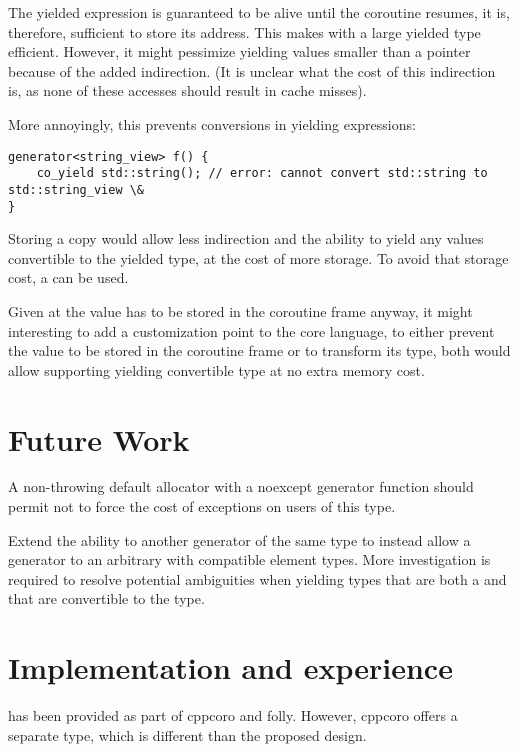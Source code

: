 \documentclass{wg21}
\begin{document}
The yielded expression is guaranteed to be alive until the coroutine resumes, it is, therefore, sufficient to store
its address. 
This makes  with a large yielded type efficient.
However, it might pessimize yielding values smaller than a pointer because of the added indirection.
(It is unclear what the cost of this indirection is, as none of these accesses should result in cache misses).

More annoyingly, this prevents conversions in yielding expressions:

\begin{lstlisting}[style=color]
generator<string_view> f() {
    co_yield std::string(); // error: cannot convert std::string to std::string_view \&
}
\end{lstlisting}

Storing a copy would allow less indirection and the ability to yield any values convertible to the yielded type,
at the cost of more storage.
To avoid that storage cost, a  can be used.

Given at the value has to be stored in the coroutine frame anyway, it might interesting to add a 
 customization point to the core language, to either prevent the value to be stored in the coroutine frame or to
transform its type, both would allow supporting yielding convertible type at no extra memory cost.  

\section{Future Work}

A non-throwing default allocator with a noexcept generator function should
permit not to force the cost of exceptions on users of this type.  

Extend the ability to  another generator of the same type to instead
allow a generator to  an arbitrary  with compatible
element types. More investigation is required to resolve potential ambiguities
when yielding types that are both a  and that are convertible to the
 type.

\section{Implementation and experience}

 has been provided as part of cppcoro and folly.
However, cppcoro offers a separate  type, which is different than the proposed design.
\end{document}
